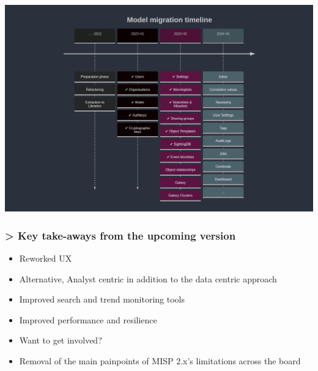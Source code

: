 \begin{frame}
    \begin{center}
        \includegraphics[width=0.99\linewidth]{pictures/timeline.png}
    \end{center}
\end{frame}

\begin{frame}
    \frametitle{> Key take-aways from the upcoming version}
    \begin{itemize}
        \item Reworked UX
        \item Alternative, Analyst centric in addition to the data centric approach
        \item Improved search and trend monitoring tools
        \item Improved performance and resilience
        \item Want to get involved?
        \item Removal of the main painpoints of MISP 2.x's limitations across the board
    \end{itemize}
\end{frame}

